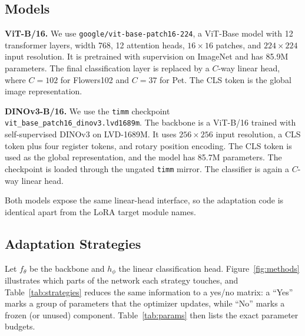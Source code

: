 \documentclass[journal,11pt]{IEEEtran}
\begin{document}
\subsection{Models}
\textbf{ViT-B/16.} We use \texttt{google/vit-base-patch16-224}, a ViT-Base model with 12 transformer layers, width 768, 12 attention heads, $16\times16$ patches, and $224\times224$ input resolution. It is pretrained with supervision on ImageNet and has 85.9M parameters. The final classification layer is replaced by a $C$-way linear head, where $C=102$ for Flowers102 and $C=37$ for Pet. The CLS token is the global image representation.

\textbf{DINOv3-B/16.} We use the \texttt{timm} checkpoint \texttt{vit\_base\_patch16\_dinov3.lvd1689m}. The backbone is a ViT-B/16 trained with self-supervised DINOv3 on LVD-1689M. It uses $256\times256$ input resolution, a CLS token plus four register tokens, and rotary position encoding. The CLS token is used as the global representation, and the model has 85.7M parameters. The checkpoint is loaded through the ungated \texttt{timm} mirror. The classifier is again a $C$-way linear head.

Both models expose the same linear-head interface, so the adaptation code is identical apart from the LoRA target module names.

\subsection{Adaptation Strategies}
Let $f_\theta$ be the backbone and $h_\phi$ the linear classification head. Figure~\ref{fig:methods} illustrates which parts of the network each strategy touches, and Table~\ref{tab:strategies} reduces the same information to a yes/no matrix: a ``Yes'' marks a group of parameters that the optimizer updates, while ``No'' marks a frozen (or unused) component. Table~\ref{tab:params} then lists the exact parameter budgets.
\end{document}
